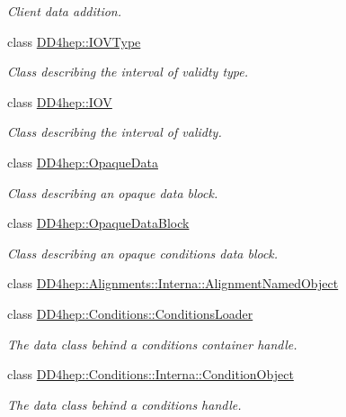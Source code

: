\begin{DoxyCompactItemize}
\begin{DoxyCompactList}\small\item\em Client data addition. \end{DoxyCompactList}\item 
class \hyperlink{class_d_d4hep_1_1_i_o_v_type}{D\+D4hep\+::\+I\+O\+V\+Type}
\begin{DoxyCompactList}\small\item\em Class describing the interval of validty type. \end{DoxyCompactList}\item 
class \hyperlink{class_d_d4hep_1_1_i_o_v}{D\+D4hep\+::\+I\+OV}
\begin{DoxyCompactList}\small\item\em Class describing the interval of validty. \end{DoxyCompactList}\item 
class \hyperlink{class_d_d4hep_1_1_opaque_data}{D\+D4hep\+::\+Opaque\+Data}
\begin{DoxyCompactList}\small\item\em Class describing an opaque data block. \end{DoxyCompactList}\item 
class \hyperlink{class_d_d4hep_1_1_opaque_data_block}{D\+D4hep\+::\+Opaque\+Data\+Block}
\begin{DoxyCompactList}\small\item\em Class describing an opaque conditions data block. \end{DoxyCompactList}\item 
class \hyperlink{class_d_d4hep_1_1_alignments_1_1_interna_1_1_alignment_named_object}{D\+D4hep\+::\+Alignments\+::\+Interna\+::\+Alignment\+Named\+Object}
\item 
class \hyperlink{class_d_d4hep_1_1_conditions_1_1_conditions_loader}{D\+D4hep\+::\+Conditions\+::\+Conditions\+Loader}
\begin{DoxyCompactList}\small\item\em The data class behind a conditions container handle. \end{DoxyCompactList}\item 
class \hyperlink{class_d_d4hep_1_1_conditions_1_1_interna_1_1_condition_object}{D\+D4hep\+::\+Conditions\+::\+Interna\+::\+Condition\+Object}
\begin{DoxyCompactList}\small\item\em The data class behind a conditions handle. \end{DoxyCompactList}\item 

\end{DoxyCompactItemize}
